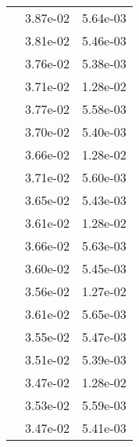\begin{table}
\begin{tabular}{c|cc|}
\multicolumn{1}{|c|}{} & \multicolumn{1}{|c|}{  3.87e-02} & \multicolumn{1}{|c|}{  5.64e-03} \\ 
\multicolumn{1}{|c|}{} & \multicolumn{1}{|c|}{  3.81e-02} & \multicolumn{1}{|c|}{  5.46e-03} \\ 
\multicolumn{1}{|c|}{} & \multicolumn{1}{|c|}{  3.76e-02} & \multicolumn{1}{|c|}{  5.38e-03} \\ 
\multicolumn{1}{|c|}{} & \multicolumn{1}{|c|}{  3.71e-02} & \multicolumn{1}{|c|}{  1.28e-02} \\ 
\multicolumn{1}{|c|}{} & \multicolumn{1}{|c|}{  3.77e-02} & \multicolumn{1}{|c|}{  5.58e-03} \\ 
\multicolumn{1}{|c|}{} & \multicolumn{1}{|c|}{  3.70e-02} & \multicolumn{1}{|c|}{  5.40e-03} \\ 
\multicolumn{1}{|c|}{} & \multicolumn{1}{|c|}{  3.66e-02} & \multicolumn{1}{|c|}{  1.28e-02} \\ 
\multicolumn{1}{|c|}{} & \multicolumn{1}{|c|}{  3.71e-02} & \multicolumn{1}{|c|}{  5.60e-03} \\ 
\multicolumn{1}{|c|}{} & \multicolumn{1}{|c|}{  3.65e-02} & \multicolumn{1}{|c|}{  5.43e-03} \\ 
\multicolumn{1}{|c|}{} & \multicolumn{1}{|c|}{  3.61e-02} & \multicolumn{1}{|c|}{  1.28e-02} \\ 
\multicolumn{1}{|c|}{} & \multicolumn{1}{|c|}{  3.66e-02} & \multicolumn{1}{|c|}{  5.63e-03} \\ 
\multicolumn{1}{|c|}{} & \multicolumn{1}{|c|}{  3.60e-02} & \multicolumn{1}{|c|}{  5.45e-03} \\ 
\multicolumn{1}{|c|}{} & \multicolumn{1}{|c|}{  3.56e-02} & \multicolumn{1}{|c|}{  1.27e-02} \\ 
\multicolumn{1}{|c|}{} & \multicolumn{1}{|c|}{  3.61e-02} & \multicolumn{1}{|c|}{  5.65e-03} \\ 
\multicolumn{1}{|c|}{} & \multicolumn{1}{|c|}{  3.55e-02} & \multicolumn{1}{|c|}{  5.47e-03} \\ 
\multicolumn{1}{|c|}{} & \multicolumn{1}{|c|}{  3.51e-02} & \multicolumn{1}{|c|}{  5.39e-03} \\ 
\multicolumn{1}{|c|}{} & \multicolumn{1}{|c|}{  3.47e-02} & \multicolumn{1}{|c|}{  1.28e-02} \\ 
\multicolumn{1}{|c|}{} & \multicolumn{1}{|c|}{  3.53e-02} & \multicolumn{1}{|c|}{  5.59e-03} \\ 
\multicolumn{1}{|c|}{} & \multicolumn{1}{|c|}{  3.47e-02} & \multicolumn{1}{|c|}{  5.41e-03} \\ 

\end{tabular}
\end{table}
